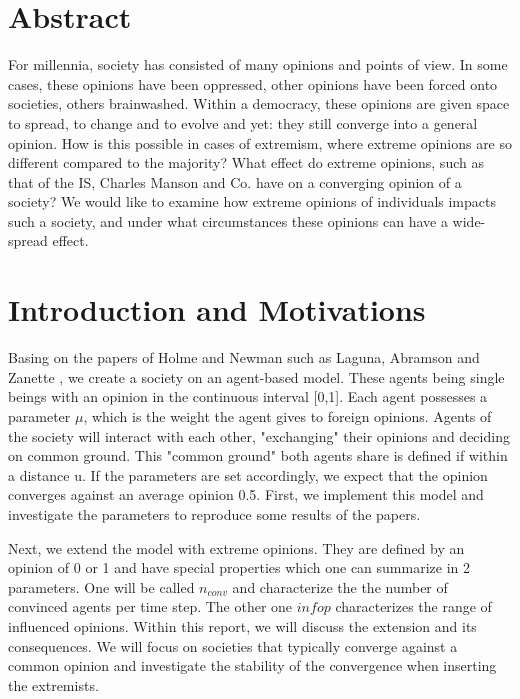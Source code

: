 \documentclass[11pt]{article}
\begin{document}




\tableofcontents

\newpage




\section{Abstract}
For millennia, society has consisted of many opinions and points of view. In some cases, these opinions have been oppressed, other opinions have been forced onto societies, others brainwashed. Within a democracy, these opinions are given space to spread, to change and to evolve and yet: they still converge into a general opinion. How is this possible in cases of extremism, where extreme opinions are so different compared to the majority? What effect do extreme opinions, such as that of the IS, Charles Manson and Co. have on a converging opinion of a society? We would like to examine how extreme opinions of individuals impacts such a society, and under what circumstances these opinions can have a wide-spread effect.


\section{Introduction and Motivations}
Basing on the papers of Holme and Newman \cite{Coevolutions} such as Laguna, Abramson and Zanette \cite{Minor}, we create a society on an agent-based model. These agents being single beings with an opinion in the continuous interval [0,1]. Each agent possesses a parameter $\mu$, which is the weight the agent gives to foreign opinions. Agents of the society will interact with each other, "exchanging" their opinions and deciding on common ground. This "common ground" both agents share is defined if within a distance u. If the parameters are set accordingly, we expect that the opinion converges against an average opinion 0.5. First, we implement this model and investigate the parameters to reproduce some results of the papers.

Next, we extend the model with extreme opinions. They are defined by an opinion of 0 or 1 and have special properties which one can summarize in 2 parameters. One will be called $n_{conv}$ and characterize the the number of convinced agents per time step. The other one $infop$ characterizes the range of influenced opinions. Within this report, we will discuss the extension and its consequences. We will focus on societies that typically converge against a common opinion and investigate the stability of the convergence when inserting the extremists.
\end{document}
